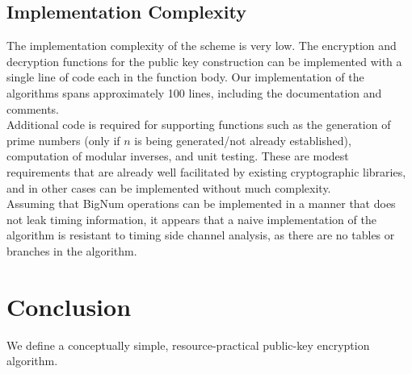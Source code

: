 \documentclass[preprint]{iacrtrans}
\begin{document}
\subsection{Implementation Complexity}
The implementation complexity of the scheme is very low. The encryption and decryption functions for the public key construction can be implemented with a single line of code each in the function body. Our implementation of the algorithms spans approximately 100 lines, including the documentation and comments.\\

Additional code is required for supporting functions such as the generation of prime numbers (only if $n$ is being generated/not already established), computation of modular inverses, and unit testing. These are modest requirements that are already well facilitated by existing cryptographic libraries, and in other cases can be implemented without much complexity. \\

Assuming that BigNum operations can be implemented in a manner that does not leak timing information, it appears that a naive implementation of the algorithm is resistant to timing side channel analysis, as there are no tables or branches in the algorithm.

\section{Conclusion}
We define a conceptually simple, resource-practical public-key encryption algorithm. 
\end{document}
